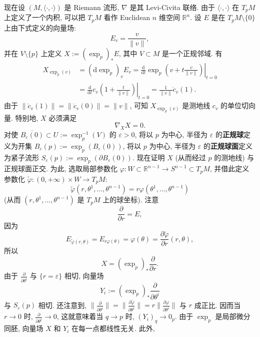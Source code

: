 现在设 $(M,\langle\cdot,\cdot\rangle)$ 是 Riemann 流形, $\nabla$ 是其 Levi-Civita 联络. 由于 $\langle\cdot,\cdot\rangle$ 在 $T_pM$ 上定义了一个内积, 可以把 $T_pM$ 看作 Euclidean $n$ 维空间 $\mathbb{R}^n$. 设 $E$ 是在 $T_pM\setminus\{0\}$ 上由下式定义的向量场:
\[
  E_v=\frac{v}{\lVert v\rVert},
\]
并在 $V\setminus\{p\}$ 上定义 $X:=(\exp_p)_*E$, 其中 $V\subset M$ 是一个正规邻域. 有
\begin{align*}
  X_{\exp_p(v)}&=(\mathrm{d}\exp_p)_vE_v
   =\left.\frac{\mathrm{d}}{\mathrm{d}t}\exp_p\left(v+t\frac{v}{\lVert v\rVert}\right)\right|_{t=0}\\
  &=\left.\frac{\mathrm{d}}{\mathrm{d}t}c_v\left(1+\frac{t}{\lVert v\rVert}\right)\right|_{t=0}
   =\frac{1}{\lVert v\rVert}\dot c_v(1).
\end{align*}
由于 $\lVert\dot c_v(1)\rVert=\lVert\dot c_v(0)\rVert=\lVert v\rVert$, 可知 $X_{\exp_p(v)}$ 是测地线 $c_v$ 的单位切向量. 特别地, $X$ 必须满足
\[
  \nabla_XX=0.
\]
对使 $\overline{B_\varepsilon(0)}\subset U:=\exp_p^{-1}(V)$ 的 $\varepsilon>0$, 将以 $p$ 为中心, 半径为 $\varepsilon$ 的\label{idx:normal-balls}\textbf{正规球}定义为开集 $B_\varepsilon(p):=\exp_p(B_\varepsilon(0))$, 将以 $p$ 为中心, 半径为 $\varepsilon$ 的\textbf{正规球面}定义为紧子流形 $S_\varepsilon(p):=\exp_p(\partial B_\varepsilon(0))$. 现在证明 $X$ (从而经过 $p$ 的测地线) 与正规球面正交. 为此, 选取局部参数化 $\varphi:W\subset\mathbb{R}^{n-1}\to S^{n-1}\subset T_pM$, 并借此定义参数化 $\widetilde\varphi:(0,+\infty)\times W\to T_pM$:
\[
  \widetilde\varphi(r,\theta^1,\ldots,\theta^{n-1})=r\varphi(\theta^1,\ldots,\theta^{n-1})
\]
(从而 $(r,\theta^1,\ldots,\theta^{n-1})$ 是 $T_pM$ 上的球坐标). 注意
\[
  \frac{\partial}{\partial r}=E,
\]
因为
\[
  E_{\widetilde\varphi(r,\theta)}=E_{r\varphi(\theta)}
  =\varphi(\theta)=\frac{\partial\widetilde\varphi}{\partial r}(r,\theta),
\]
所以
\begin{equation}\label{eq:radial-field-in-normal-ball}
  X=(\exp_p)_*\frac{\partial}{\partial r}.
\end{equation}
由于 $\frac{\partial}{\partial\theta^i}$ 与 $\{r=\varepsilon\}$ 相切, 向量场
\begin{equation}\label{eq:angular-field-in-normal-ball}
  Y_i:=(\exp_p)_*\frac{\partial}{\partial\theta^i}
\end{equation}
与 $S_\varepsilon(p)$ 相切. 还注意到, $\bigl\lVert\frac{\partial}{\partial\theta^i}\bigr\rVert
=\bigl\lVert\frac{\partial\widetilde\varphi}{\partial\theta^i}\bigr\rVert
=r\bigl\lVert\frac{\partial\varphi}{\partial\theta^i}\bigr\rVert$ 与 $r$ 成正比. 因而当 $r\to0$ 时, $\frac{\partial}{\partial\theta^i}\to0$, 这就意味着当 $q\to p$ 时, $(Y_i)_q\to0_p$. 由于 $\exp_p$ 是局部微分同胚, 向量场 $X$ 和 $Y_i$ 在每一点都线性无关. 此外,
